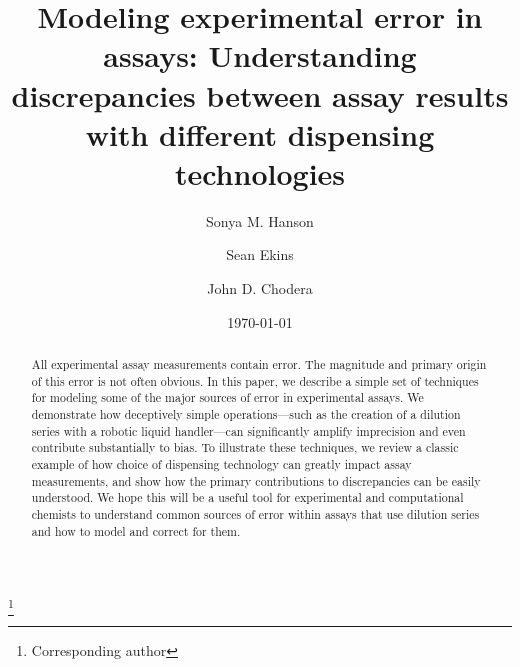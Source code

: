 \documentclass[aps,pre,twocolumn,nofootinbib,superscriptaddress,linenumbers]{revtex4-1}
\begin{document}
\title{Modeling experimental error in assays: Understanding discrepancies between assay results with different dispensing technologies}

\author{Sonya M. Hanson}
\author{Sean Ekins}
\author{John D. Chodera}
 \thanks{Corresponding author}

\date{\today}

\begin{abstract}

All experimental assay measurements contain error.
The magnitude and primary origin of this error is not often obvious.
In this paper, we describe a simple set of techniques for modeling some of the major sources of error in experimental assays. We demonstrate how deceptively simple operations---such as the creation of a dilution series with a robotic liquid handler---can significantly amplify imprecision and even contribute substantially to bias.
To illustrate these techniques, we review a classic example of how choice of dispensing technology can greatly impact assay measurements, and show how the primary contributions to discrepancies can be easily understood.
We hope this will be a useful tool for experimental and computational chemists to understand common sources of error within assays that use dilution series and how to model and correct for them.

\end{abstract}

\maketitle

\end{document}

